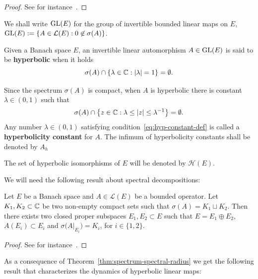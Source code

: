 \documentclass{article}
\newcommand{\abs}[1]{\left\lvert{#1}\right\rvert}
\newcommand{\mc}{\mathcal} \newcommand{\ms}{\mathscr}
\begin{document}
\begin{proof}
  See for instance~\cite[\S1.2]{MurphyCAlgebrasOpTheory}.
\end{proof}

We shall write $\operatorname{GL}(E)$ for the group of invertible bounded linear maps on $E$, \ie~$\GL(E):=\{A\in\mc{L}(E) : 0\not\in\sigma(A)\}$.

\begin{definition}
  \label{def:hyperbolic-linear-automorphisms}
  Given a Banach space $E$, an invertible linear automorphism $A\in\operatorname{GL}(E)$ is said to be \textbf{hyperbolic} when it holds
  \begin{displaymath}
    \sigma(A)\cap\{\lambda\in\C : \abs{\lambda}=1\}=\emptyset.
  \end{displaymath}

  Since the spectrum $\sigma(A)$ is compact, when $A$ is hyperbolic there is constant $\lambda\in (0,1)$ such that
  \begin{equation}\label{eq:hyp-constant-def}
    \sigma(A)\cap\left\{z\in\C : \lambda\leq\abs{z}\leq\lambda^{-1}\right\}=\emptyset.
  \end{equation}
  Any number $\lambda\in(0,1)$ satisfying condition~\eqref{eq:hyp-constant-def} is called a \textbf{hyperbolicity constant} for $A$. The infimum of hyperbolicity constants shall be denoted by $A_h$
\end{definition}

The set of hyperbolic isomorphisms of $E$ will be denoted by $\mc{H}(E)$.

We will need the following result about spectral decompositions:
\begin{theorem}\label{thm:spectral-decomposition}
  Let $E$ be a Banach space and $A\in\mc{L}(E)$ be a bounded operator. Let $K_{1},K_{2}\subset\mathbb{C}$ be two non-empty compact sets such that $\sigma(A)=K_{1}\sqcup K_{2}$. Then there exists two closed proper subspaces $E_{1},E_{2}\subset E$ such that $E=E_{1}\oplus E_{2}$, $A(E_{i})\subset E_{i}$ and $\sigma\big(A\big|_{E_{i}}\big)=K_{i}$, for $i\in\{1,2\}$.
\end{theorem}

\begin{proof}
  See for instance~\cite[Chapter VII]{DunfordSchwartzLinOp}.
\end{proof}

As a consequence of Theorem~\ref{thm:spectrum-spectral-radius} we get the following result that characterizes the dynamics of hyperbolic linear maps:
\end{document}
